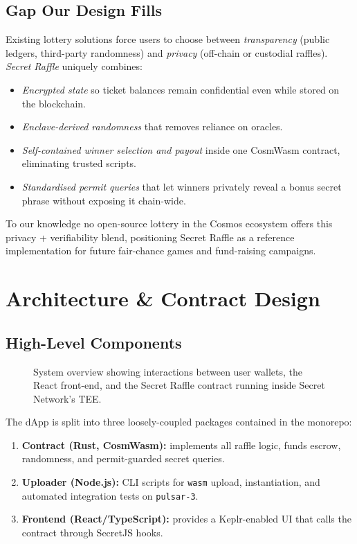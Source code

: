 \documentclass[12pt]{article}
\begin{document}
\subsection*{Gap Our Design Fills}
Existing lottery solutions force users to choose between \emph{transparency} (public ledgers, third-party randomness) and \emph{privacy} (off-chain or custodial raffles).  \emph{Secret Raffle} uniquely combines:
\begin{itemize}
  \item \emph{Encrypted state} so ticket balances remain confidential even while stored on the blockchain.
  \item \emph{Enclave-derived randomness} that removes reliance on oracles.
  \item \emph{Self-contained winner selection and payout} inside one CosmWasm contract, eliminating trusted scripts.
  \item \emph{Standardised permit queries} that let winners privately reveal a bonus secret phrase without exposing it chain-wide.
\end{itemize}
To our knowledge no open-source lottery in the Cosmos ecosystem offers this privacy + verifiability blend, positioning Secret Raffle as a reference implementation for future fair-chance games and fund-raising campaigns.

\section*{Architecture \& Contract Design}

\subsection*{High-Level Components}
\begin{figure}[h]
  \centering
  \caption{System overview showing interactions between user wallets, the React front-end, and the Secret Raffle contract running inside Secret Network's TEE.}
\end{figure}

The dApp is split into three loosely-coupled packages contained in the monorepo:
\begin{enumerate}
  \item \textbf{Contract (Rust, CosmWasm):} implements all raffle logic, funds escrow, randomness, and permit-guarded secret queries.
  \item \textbf{Uploader (Node.js):} CLI scripts for \verb|wasm| upload, instantiation, and automated integration tests on \texttt{pulsar-3}.
  \item \textbf{Frontend (React/TypeScript):} provides a Keplr-enabled UI that calls the contract through SecretJS hooks.
\end{enumerate}
\end{document}
